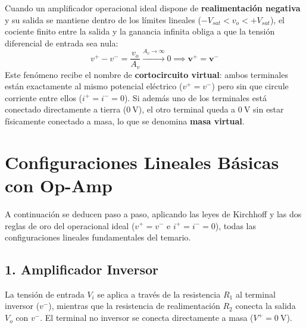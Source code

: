 \begin{ley}
Cuando un amplificador operacional ideal dispone de \textbf{realimentación negativa} y su salida se mantiene dentro de los límites lineales ($-V_{sat} < v_o < +V_{sat}$), el cociente finito entre la salida y la ganancia infinita obliga a que la tensión diferencial de entrada sea nula:
\begin{equation}
    v^+ - v^- = \frac{v_o}{A_v} \xrightarrow{A_v \to \infty} 0 \implies \mathbf{v^+ = v^-}
\end{equation}
Este fenómeno recibe el nombre de \textbf{cortocircuito virtual}: ambos terminales están exactamente al mismo potencial eléctrico ($v^+ = v^-$) pero sin que circule corriente entre ellos ($i^+ = i^- = 0$). Si además uno de los terminales está conectado directamente a tierra ($0\ \si{\volt}$), el otro terminal queda a $0\ \si{\volt}$ sin estar físicamente conectado a masa, lo que se denomina \textbf{masa virtual}.
\end{ley}

\section{Configuraciones Lineales Básicas con Op-Amp}

A continuación se deducen paso a paso, aplicando las leyes de Kirchhoff y las dos reglas de oro del operacional ideal ($v^+ = v^-$ e $i^+ = i^- = 0$), todas las configuraciones lineales fundamentales del temario.

\subsection{1. Amplificador Inversor}

La tensión de entrada $V_i$ se aplica a través de la resistencia $R_1$ al terminal inversor ($v^-$), mientras que la resistencia de realimentación $R_2$ conecta la salida $V_o$ con $v^-$. El terminal no inversor se conecta directamente a masa ($V^+ = 0\ \si{\volt}$).

\begin{center}
\end{center}

